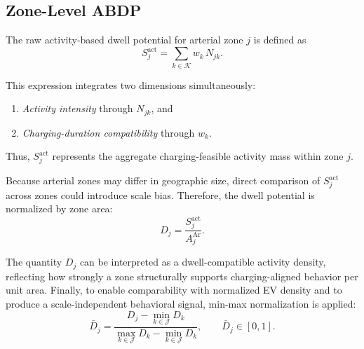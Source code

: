 \documentclass[conference]{IEEEtran}
\begin{document}
\subsection{Zone-Level ABDP}

The raw activity-based dwell potential for arterial zone $j$ is
defined as
\begin{equation}
S^{\mathrm{act}}_j =
\sum_{k\in\mathcal{K}} w_k\, N_{jk}.
\end{equation}

This expression integrates two dimensions simultaneously:

\begin{enumerate}
\item \emph{Activity intensity} through $N_{jk}$, and
\item \emph{Charging-duration compatibility} through $w_k$.
\end{enumerate}

Thus, $S^{\mathrm{act}}_j$ represents the aggregate charging-feasible
activity mass within zone $j$.

Because arterial zones may differ in geographic size, direct comparison
of $S^{\mathrm{act}}_j$ across zones could introduce scale bias.
Therefore, the dwell potential is normalized by zone area:
\begin{equation}
D_j =
\frac{S^{\mathrm{act}}_j}{A^{\mathrm{Ar}}_j}.
\end{equation}

The quantity $D_j$ can be interpreted as a dwell-compatible activity
density, reflecting how strongly a zone structurally supports
charging-aligned behavior per unit area.
Finally, to enable comparability with normalized EV density and to
produce a scale-independent behavioral signal, min-max normalization
is applied:
\begin{equation}
\bar{D}_j =
\frac{D_j - \min_{k\in\mathcal{J}} D_k}
{\max_{k\in\mathcal{J}} D_k - \min_{k\in\mathcal{J}} D_k},
\qquad \bar{D}_j\in[0,1].
\end{equation}
\end{document}
